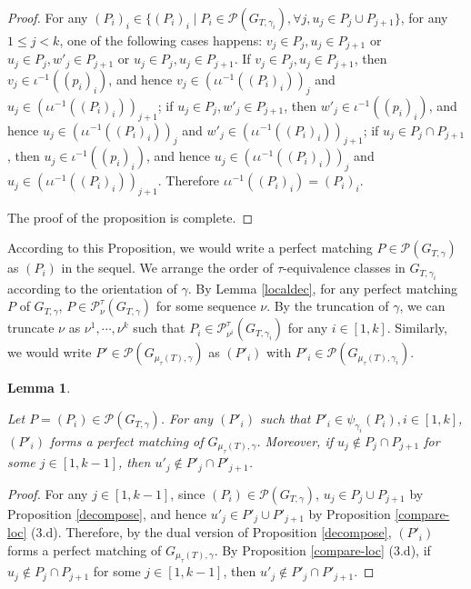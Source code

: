 \documentclass[10pt]{amsart}
\theoremstyle{theorems}
\newtheorem{Lemma}[Theorem]{Lemma}
\begin{document}
\begin{proof}
For any  $(P_i)_i \in\{(P_i)_{i}\;|\;P_i\in \mathcal P(G_{T,\gamma_i}), \forall j, u_j\in P_j\cup P_{j+1}\}$, for any $1\leq j<k$, one of the following cases happens: $v_j\in P_j, u_j\in P_{j+1}$ or $u_j\in P_j, w'_j\in P_{j+1}$ or $u_j\in P_j, u_j\in P_{j+1}$. If $v_j\in P_j, u_j\in P_{j+1}$, then $v_j\in \iota^{-1}((p_i)_i)$, and hence $v_j\in (\iota\iota^{-1}((P_i)_i))_j$ and $u_j\in (\iota\iota^{-1}((P_i)_i))_{j+1}$; if $u_j\in P_j, w'_j\in P_{j+1}$, then $w'_j\in \iota^{-1}((p_i)_i)$, and hence $u_j\in (\iota\iota^{-1}((P_i)_i))_{j}$ and $w'_j\in (\iota\iota^{-1}((P_i)_i))_{j+1}$; if $u_j\in P_j\cap P_{j+1}$, then $u_j\in \iota^{-1}((p_i)_i)$, and hence $u_j\in (\iota\iota^{-1}((P_i)_i))_{j}$ and $u_j\in (\iota\iota^{-1}((P_i)_i))_{j+1}$. Therefore $\iota\iota^{-1}((P_i)_i)=(P_i)_i$.

The proof of the proposition is complete.
\end{proof}

\medskip

According to this Proposition, we would write a perfect matching $P\in \mathcal P(G_{T,\gamma})$ as $(P_i)$ in the sequel. We arrange the order of $\tau$-equivalence classes in $G_{T,\gamma_i}$ according to the orientation of $\gamma$. By Lemma \ref{localdec}, for any perfect matching $P$ of $G_{T,\gamma}$, $P\in \mathcal P^{\tau}_{\nu}(G_{T,\gamma})$ for some sequence $\nu$. By the truncation of $\gamma$, we can truncate $\nu$ as $\nu^1,\cdots,\nu^k$ such that $P_i\in \mathcal P^{\tau}_{\nu^i}(G_{T,\gamma_i})$ for any $i\in [1,k]$. Similarly, we would write $P'\in \mathcal P(G_{\mu_{\tau}(T),\gamma})$ as $(P'_i)$ with $P'_i\in \mathcal P(G_{\mu_{\tau}(T),\gamma_i})$.

\medskip

\begin{Lemma}\label{formglobal}

Let $P=(P_i)\in \mathcal P(G_{T,\gamma})$. For any $(P'_i)$ such that $P'_i\in \psi_{\gamma_i}(P_i), i\in [1,k]$, $(P'_i)$ forms a perfect matching of $G_{\mu_{\tau}(T),\gamma}$. Moreover, if $u_j\notin P_j\cap P_{j+1}$ for some $j\in [1,k-1]$, then $u'_j\notin P'_j\cap P'_{j+1}$.

\end{Lemma}

\begin{proof}

For any $j\in [1,k-1]$, since $(P_i)\in \mathcal P(G_{T,\gamma})$, $u_j\in P_j\cup P_{j+1}$ by Proposition \ref{decompose}, and hence $u'_j\in P'_j\cup P'_{j+1}$   by Proposition \ref{compare-loc} (3.d). Therefore, by the dual version of Proposition \ref{decompose}, $(P'_i)$ forms a perfect matching of $G_{\mu_{\tau}(T),\gamma}$. By Proposition \ref{compare-loc} (3.d), if $u_j\notin P_j\cap P_{j+1}$ for some $j\in [1,k-1]$, then $u'_j\notin P'_j\cap P'_{j+1}$.
\end{proof}
\end{document}
